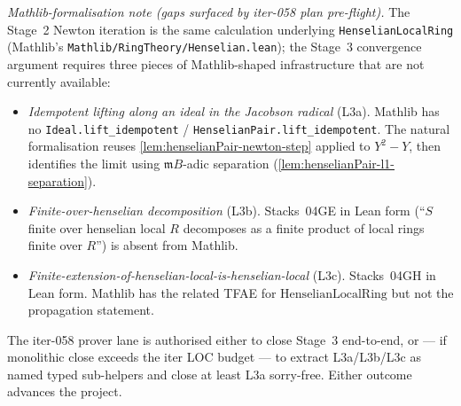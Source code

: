 \emph{Mathlib-formalisation note (gaps surfaced by iter-058 plan
pre-flight).} The Stage~2 Newton iteration is the same
calculation underlying \texttt{HenselianLocalRing} (Mathlib's
\texttt{Mathlib/RingTheory/Henselian.lean}); the Stage~3
convergence argument requires three pieces of Mathlib-shaped
infrastructure that are not currently available:
\begin{itemize}
\item \emph{Idempotent lifting along an ideal in the Jacobson
radical} (L3a). Mathlib has no
\texttt{Ideal.lift\_idempotent} / \texttt{HenselianPair.lift\_idempotent}.
The natural formalisation reuses
\cref{lem:henselianPair-newton-step} applied to $Y^2 - Y$, then
identifies the limit using $\mathfrak m B$-adic separation
(\cref{lem:henselianPair-l1-separation}).
\item \emph{Finite-over-henselian decomposition} (L3b). Stacks~04GE
in Lean form (``$S$ finite over henselian local $R$ decomposes as a
finite product of local rings finite over $R$'') is absent from
Mathlib.
\item \emph{Finite-extension-of-henselian-local-is-henselian-local}
(L3c). Stacks~04GH in Lean form. Mathlib has the related TFAE for
$\mathrm{HenselianLocalRing}$ but not the propagation statement.
\end{itemize}
The iter-058 prover lane is authorised either to close Stage~3
end-to-end, or — if monolithic close exceeds the iter LOC budget
— to extract L3a/L3b/L3c as named typed sub-helpers and close at
least L3a sorry-free. Either outcome advances the project.

